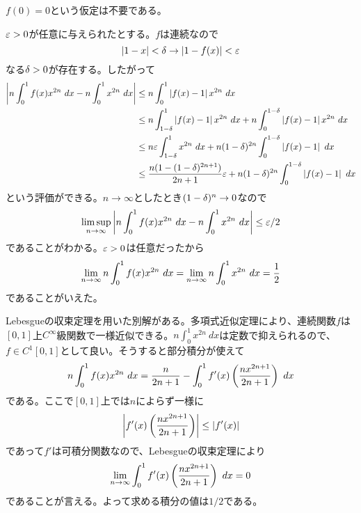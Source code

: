 \subsubsection{}%
\begin{rem}
  $f(0)=0$という仮定は不要である。
\end{rem}
\begin{sol}
${\varepsilon} > 0$が任意に与えられたとする。$f$は連続なので
\[
\left \lvert 1-x  \right \rvert < {\delta} \to \left \lvert  1 - f(x) \right \rvert < {\varepsilon}
\]
なる${\delta} > 0$が存在する。したがって
\begin{align*}
  \left \lvert  n \int_0^1 f(x) x^{2n} \ dx - n \int_0^1 x^{2n} \ dx  \right \rvert &\leq n \int_0^1 \left \lvert  f(x)- 1 \right \rvert x^{2n} \ dx \\
  &\leq n \int_{1- {\delta}}^1 \left \lvert  f(x)- 1 \right \rvert x^{2n} \ dx + n \int_0^{1-{\delta}} \left \lvert  f(x)- 1 \right \rvert x^{2n} \ dx  \\
  &\leq n {\varepsilon} \int_{1- {\delta}}^1  x^{2n} \ dx + n (1 - {\delta})^{2n} \int_0^{1-{\delta}} \left \lvert  f(x)- 1 \right \rvert  \ dx  \\
  &\leq \frac{  n (1-(1-{\delta})^{2n+1}) }{ 2n+1 } {\varepsilon} + n (1 - {\delta})^{2n} \int_0^{1-{\delta}} \left \lvert  f(x)- 1 \right \rvert  \ dx
\end{align*}
という評価ができる。$n \to \infty$としたとき$(1 - {\delta})^n \to 0$なので
\[
\limsup_{n \to \infty } \left \lvert  n \int_0^1 f(x) x^{2n} \ dx - n \int_0^1 x^{2n} \ dx  \right \rvert \leq {\varepsilon} /2
\]
であることがわかる。${\varepsilon} > 0$は任意だったから
\[
\lim_{n \to \infty} n \int_0^1 f(x) x^{2n} \ dx = \lim_{n \to \infty} n \int_0^1  x^{2n} \ dx =  \frac{1}{2}
\]
であることがいえた。
\end{sol}

\begin{com}
  Lebesgueの収束定理を用いた別解がある。多項式近似定理により、連続関数$f$は$[0,1]$上$C^{\infty}$級関数で一様近似できる。$n \int_0^1  x^{2n} \ dx$は定数で抑えられるので、$f \in C^1[0,1]$として良い。そうすると部分積分が使えて
  \[
  n \int_0^1 f(x) x^{2n} \ dx = \frac{n}{2n+1} -  \int_0^1 f'(x) \left(   \frac{ nx^{2n+1} }{ 2n+1 } \right) \ dx
  \]
  である。ここで$[0,1]$上では$n$によらず一様に
  \[
  \left \lvert   f'(x) \left(   \frac{ nx^{2n+1} }{ 2n+1 } \right)  \right \rvert \leq \left \lvert  f'(x)  \right \rvert
  \]
  であって$f'$は可積分関数なので、Lebesgueの収束定理により
  \[
   \lim_{n \to \infty}  \int_0^1 f'(x) \left(   \frac{ nx^{2n+1} }{ 2n+1 } \right) \ dx = 0
   \]
  であることが言える。よって求める積分の値は$1/2$である。
\end{com}

